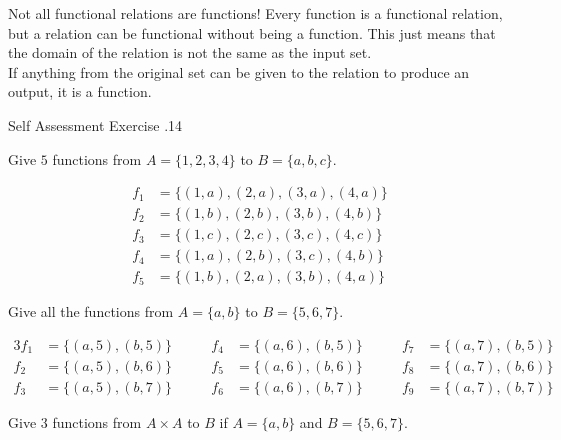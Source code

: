 \documentclass[\main/notes.tex]{subfiles}
\begin{document}
				\begin{sidenote}{Not all functional relations are functions!}
					Every function is a functional relation, but a relation can be functional without being a function. This just means that the domain of the relation is not the same as the input set.\\
					If anything from the original set can be given to the relation to produce an output, it is a function.
				\end{sidenote}
				\begin{exercise}{Self Assessment Exercise \thechapter.14}
					\begin{questions}
						\item Give $5$ functions from $A = \{1, 2, 3, 4\}$ to $B = \{a, b, c\}$.
							\begin{answer}
								\begin{align*}
									f_{1} &= \bigl\{(1, a), (2, a), (3, a), (4, a)\bigr\}\\
									f_{2} &= \bigl\{(1, b), (2, b), (3, b), (4, b)\bigr\}\\
									f_{3} &= \bigl\{(1, c), (2, c), (3, c), (4, c)\bigr\}\\
									f_{4} &= \bigl\{(1, a), (2, b), (3, c), (4, b)\bigr\}\\
									f_{5} &= \bigl\{(1, b), (2, a), (3, b), (4, a)\bigr\}
								\end{align*}
							\end{answer}
						\item Give all the functions from $A = \{a, b\}$ to $B = \{5, 6, 7\}$.
							\begin{answer}
								\begin{alignat*}{3}
									f_{1} &= \bigl\{(a, 5), (b, 5)\bigr\} \qquad & f_{4} &= \bigl\{(a, 6), (b, 5)\bigr\} \qquad & f_{7} &= \bigl\{(a, 7), (b, 5)\bigr\}\\
									f_{2} &= \bigl\{(a, 5), (b, 6)\bigr\} \qquad & f_{5} &= \bigl\{(a, 6), (b, 6)\bigr\} \qquad & f_{8} &= \bigl\{(a, 7), (b, 6)\bigr\}\\
									f_{3} &= \bigl\{(a, 5), (b, 7)\bigr\} \qquad & f_{6} &= \bigl\{(a, 6), (b, 7)\bigr\} \qquad & f_{9} &= \bigl\{(a, 7), (b, 7)\bigr\}
								\end{alignat*}
							\end{answer}
						\item Give $3$ functions from $A \times A$ to $B$ if $A = \{a, b\}$ and $B = \{5, 6, 7\}$.
							\begin{answer}
								\begin{align*}

\end{align*}
\end{answer}
\end{questions}
\end{exercise}
\end{document}

